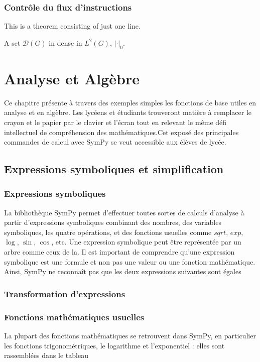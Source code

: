 \subsection{Contrôle du flux d’instructions}
This is a theorem consisting of just one line.

\begin{exercise}
A set $\mathcal{D}(G)$ in dense in $L^2(G)$, $|\cdot|_0$. 
\end{exercise}
\begin{solution}
\end{solution}

\chapter{Analyse et Algèbre}
Ce chapitre présente à travers des exemples simples les fonctions de base utiles en analyse et en algèbre. Les 
lycéens et étudiants trouveront matière à remplacer le crayon et le papier par le clavier et l'écran tout en 
relevant le même défi intellectuel de compréhension des mathématiques.Cet exposé des principales commandes de calcul avec SymPy se veut accessible aux élèves de lycée.

\section{Expressions symboliques et simplification}
 \subsection{Expressions symboliques}
La bibliothèque SymPy permet d'effectuer toutes sortes de calculs d'analyse à partir d'expressions
symboliques combinant des nombres, des variables symboliques, les quatre opérations, et des fonctions usuelles comme $sqrt$, $exp$, $\log$, $\sin$, $\cos$, etc. Une expression symbolique peut être représentée par un arbre comme ceux de la. Il est important de comprendre qu'une expression symbolique est une formule et non pas une valeur ou une fonction mathématique. Ainsi, SymPy ne reconnaît pas que les deux expressions suivantes sont égales
\subsection{Transformation d'expressions}
\subsection{Fonctions mathématiques usuelles}
La plupart des fonctions mathématiques se retrouvent dans SymPy, en particulier les
fonctions trigonométriques, le logarithme et l'exponentiel : elles sont rassemblées
dans le tableau

